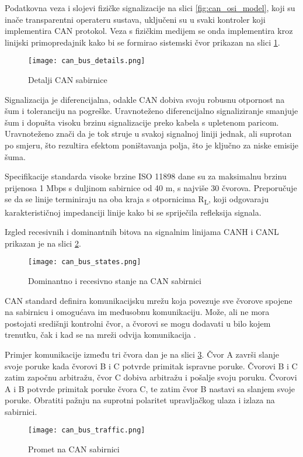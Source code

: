 Podatkovna veza i slojevi fizičke signalizacije na slici \ref{fig:can_osi_model}, koji su inače transparentni operateru sustava, uključeni su u svaki kontroler koji implementira CAN protokol. Veza s fizičkim medijem se onda implementira kroz linijski primopredajnik kako bi se formirao sistemski čvor prikazan na slici \ref{fig:can_bus_details}.
\begin{figure}[H]
	\centering
	\texttt{[image: can\_bus\_details.png]}
	\caption{Detalji CAN sabirnice \cite[str. 7]{can_manual}}
	\label{fig:can_bus_details}
\end{figure}
Signalizacija je diferencijalna, odakle CAN dobiva svoju robusnu otpornost na šum i toleranciju na pogreške. Uravnoteženo diferencijalno signaliziranje smanjuje šum i dopušta visoku brzinu signalizacije preko kabela s upletenom paricom. Uravnoteženo znači da je tok struje u svakoj signalnoj liniji jednak, ali suprotan po smjeru, što rezultira efektom poništavanja polja, što je ključno za niske emisije šuma.

Specifikacije standarda visoke brzine ISO 11898 dane su za maksimalnu brzinu prijenosa 1 Mbps s duljinom sabirnice od 40 m, s najviše 30 čvorova. Preporučuje se da se linije terminiraju na oba kraja s otpornicima R\textsubscript{L}, koji odgovaraju karakterističnoj impedanciji linije kako bi se spriječila refleksija signala.

Izgled recesivnih i dominantnih bitova na signalnim linijama CANH i CANL prikazan je na slici \ref{fig:can_bus_states}.
\begin{figure}[H]
	\centering
	\texttt{[image: can\_bus\_states.png]}
	\caption{Dominantno i recesivno stanje na CAN sabirnici \cite[str. 8]{can_manual}}
	\label{fig:can_bus_states}
\end{figure}

CAN standard definira komunikacijsku mrežu koja povezuje sve čvorove spojene na sabirnicu i omogućava im međusobnu komunikaciju. Može, ali ne mora postojati središnji kontrolni čvor, a čvorovi se mogu dodavati u bilo kojem trenutku, čak i kad se na mreži odvija komunikacija .

Primjer komunikacije između tri čvora dan je na slici \ref{fig:can_bus_traffic}. Čvor A završi slanje svoje poruke kada čvorovi B i C potvrde primitak ispravne poruke. Čvorovi B i C zatim započnu arbitražu, čvor C dobiva arbitražu i pošalje svoju poruku. Čvorovi A i B potvrde primitak poruke čvora C, te zatim čvor B nastavi sa slanjem svoje poruke. Obratiti pažnju na suprotni polaritet upravljačkog ulaza i izlaza na sabirnici.
\begin{figure}[H]
	\centering
	\texttt{[image: can\_bus\_traffic.png]}
	\caption{Promet na CAN sabirnici \cite[str. 9]{can_manual}}
	\label{fig:can_bus_traffic}
\end{figure}

